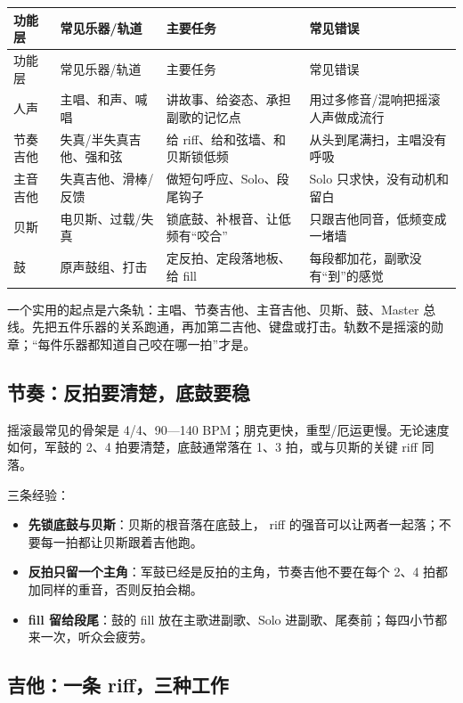 \begin{longtable}{p{}p{}p{}p{}}
\toprule
功能层 & 常见乐器/轨道 & 主要任务 & 常见错误 \\
\midrule
\endfirsthead
\toprule
功能层 & 常见乐器/轨道 & 主要任务 & 常见错误 \\
\midrule
\endhead
人声 & 主唱、和声、喊唱 & 讲故事、给姿态、承担副歌的记忆点 & 用过多修音/混响把摇滚人声做成流行 \\
节奏吉他 & 失真/半失真吉他、强和弦 & 给 riff、给和弦墙、和贝斯锁低频 & 从头到尾满扫，主唱没有呼吸 \\
主音吉他 & 失真吉他、滑棒/反馈 & 做短句呼应、Solo、段尾钩子 & Solo 只求快，没有动机和留白 \\
贝斯 & 电贝斯、过载/失真 & 锁底鼓、补根音、让低频有“咬合” & 只跟吉他同音，低频变成一堵墙 \\
鼓 & 原声鼓组、打击 & 定反拍、定段落地板、给 fill & 每段都加花，副歌没有“到”的感觉 \\
\bottomrule
\end{longtable}

一个实用的起点是六条轨：主唱、节奏吉他、主音吉他、贝斯、鼓、Master 总线。先把五件乐器的关系跑通，再加第二吉他、键盘或打击。轨数不是摇滚的勋章；“每件乐器都知道自己咬在哪一拍”才是。

\subsection{节奏：反拍要清楚，底鼓要稳}
\label{sec:rock-groove}

摇滚最常见的骨架是 4/4、90—140 BPM；朋克更快，重型/厄运更慢。无论速度如何，军鼓的 2、4 拍要清楚，底鼓通常落在 1、3 拍，或与贝斯的关键 riff 同落。

三条经验：

\begin{itemize}
\item \textbf{先锁底鼓与贝斯}：贝斯的根音落在底鼓上， riff 的强音可以让两者一起落；不要每一拍都让贝斯跟着吉他跑。
\item \textbf{反拍只留一个主角}：军鼓已经是反拍的主角，节奏吉他不要在每个 2、4 拍都加同样的重音，否则反拍会糊。
\item \textbf{fill 留给段尾}：鼓的 fill 放在主歌进副歌、Solo 进副歌、尾奏前；每四小节都来一次，听众会疲劳。
\end{itemize}

\subsection{吉他：一条 riff，三种工作}
\label{sec:rock-guitar}

